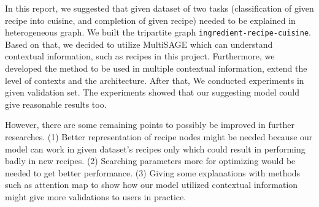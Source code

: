 In this report, we suggested that given dataset of two tasks (classification of given recipe into cuisine, and completion of given recipe) needed to be explained in heterogeneous graph. We built the tripartite graph \texttt{ingredient-recipe-cuisine}. Based on that, we decided to utilize MultiSAGE \cite{yang2020multisage} which can understand contextual information, such as recipes in this project. Furthermore, we developed the method to be used in multiple contextual information, extend the level of contexts and the architecture. After that, We conducted experiments in given validation set. The experiments showed that our suggesting model could give reasonable results too.

 However, there are some remaining points to possibly be improved in further researches. (1) Better representation of recipe nodes might be needed because our model can work in given dataset's recipes only which could result in performing badly in new recipes. (2) Searching parameters more for optimizing would be needed to get better performance. (3) Giving some explanations with methods such as attention map to show how our model utilized contextual information might give more validations to users in practice. 

\begin{comment}
\end{comment}